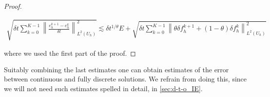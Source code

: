 \documentclass[english,a4paper,9pt,oneside]{scrbook}	%
\theoremstyle{break}
\newenvironment{mproof}[1][\proofname]{%
  \begin{proof}[#1]$ $\par\nobreak\ignorespaces
}{%
  \end{proof}
}
\renewcommand*{\proofname}{Proof}
\theoremstyle{remark}
\newcommand{\norm}[1]{\left\lVert#1\right\rVert}
\newcommand{\te}{\theta}
\begin{document}
\begin{appendices}
\begin{mproof}
%

\begin{align*}
\sqrt{\delta t \sum_{k=0}^{K-1} \norm{\frac{e_{h}^{k+1}-e_h^k}{\delta t}}_{L^2(U_h)}^2}  \lesssim \delta t^{1/\te} E + \sqrt{\delta t \sum_{k=0}^{K-1}\norm{\theta \delta f_h^{k+1}+(1-\theta)\delta f_h^k}_{L^2(U_h)}^2}
\end{align*}

where we used the first part of the proof.
%
%
%
%
%
%
\end{mproof}

Suitably combining the last estimates one can obtain estimates of the error between continuous and fully discrete solutions. We refrain from doing this, since we will not need such estimates spelled in detail, in \cref{sec:d-t-o_IE}.

\end{appendices}

\newpage


\printbibliography[title={Bibliography}]

\end{document}
